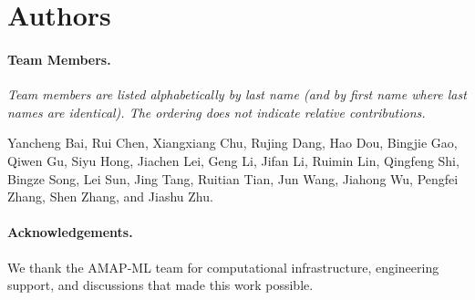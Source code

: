 \documentclass{llmxive}
\begin{document}
\section*{Authors}

\paragraph{Team Members.}
\emph{Team members are listed alphabetically by last name (and by first name
where last names are identical). The ordering does not indicate relative
contributions.}

Yancheng Bai, Rui Chen, Xiangxiang Chu, Rujing Dang, Hao Dou, Bingjie Gao, Qiwen Gu, Siyu Hong,
Jiachen Lei, Geng Li, Jifan Li, Ruimin Lin, Qingfeng Shi, Bingze Song,
Lei Sun, Jing Tang, Ruitian Tian, Jun Wang, Jiahong Wu, Pengfei Zhang,
Shen Zhang, and Jiashu Zhu.

\paragraph{Acknowledgements.}
We thank the AMAP-ML team for computational infrastructure, engineering support,
and discussions that made this work possible.




\end{document}

